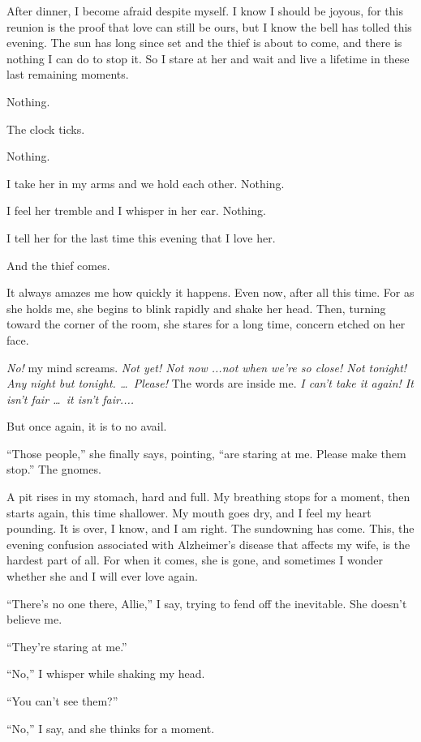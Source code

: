 \documentclass[10pt, twoside, openright]{book}
\begin{document}
After dinner, I become afraid despite myself. I know I should be joyous,
for this reunion is the proof that love can still be ours, but I know
the bell has tolled this evening. The sun has long since set and the
thief is about to come, and there is nothing I can do to stop it. So I
stare at her and wait and live a lifetime in these last remaining
moments.


Nothing.

The clock ticks.

Nothing.

I take her in my arms and we hold each other. Nothing.

I feel her tremble and I whisper in her ear. Nothing.

I tell her for the last time this evening that I love her.

And the thief comes.


It always amazes me how quickly it happens. Even now, after all this
time. For as she holds me, she begins to blink rapidly and shake her
head. Then, turning toward the corner of the room, she stares for a long
time, concern etched on her face.

\emph{No!} my mind screams. \emph{Not yet! Not now ...not when we're so
close! Not tonight! Any night but tonight.   \dots\ Please!} The words are
inside me. \emph{I can't take it again! It isn't fair   \dots\ it isn't
fair....}


But once again, it is to no avail.


``Those people,'' she finally says, pointing, ``are staring at me.
Please make them stop.'' The gnomes.

A pit rises in my stomach, hard and full. My breathing stops for a
moment, then starts again, this time shallower. My mouth goes dry, and I
feel my heart pounding. It is over, I know, and I am right. The
sundowning has come. This, the evening confusion associated with
Alzheimer's disease that affects my wife, is the hardest part of all.
For when it comes, she is gone, and sometimes I wonder whether she and I
will ever love again.

``There's no one there, Allie,'' I say, trying to fend off the
inevitable. She doesn't believe me.


``They're staring at me.''

``No,'' I whisper while shaking my head.

``You can't see them?''

``No,'' I say, and she thinks for a moment.
\end{document}
